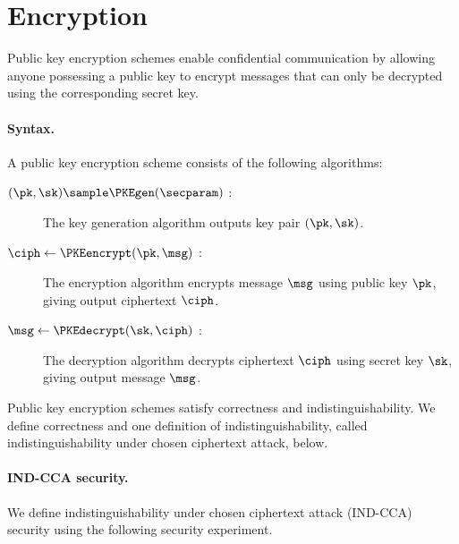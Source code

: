 \section{Encryption}\label{sec:prelims-encryption}

Public key encryption schemes enable confidential communication by allowing
anyone possessing a public key to encrypt messages that can only be decrypted
using the corresponding secret key.

\paragraph{Syntax.} A public key encryption scheme consists of the following
algorithms:

\begin{description}

  \item[$(\pk, \sk) \sample \PKEgen(\secparam)$ : ] The key generation
    algorithm outputs key pair $(\pk, \sk)$.

  \item[$\ciph \leftarrow \PKEencrypt(\pk, \msg)$ : ] The encryption algorithm
    encrypts message $\msg$ using public key $\pk$, giving output ciphertext
    $\ciph$.

  \item[$\msg \leftarrow \PKEdecrypt(\sk, \ciph)$ : ] The decryption algorithm
    decrypts ciphertext $\ciph$ using secret key $\sk$, giving output message
    $\msg$.

\end{description}

Public key encryption schemes satisfy correctness and indistinguishability. We
define correctness and one definition of indistinguishability, called
indistinguishability under chosen ciphertext attack, below.

\paragraph{IND-CCA security.} We define indistinguishability under chosen
ciphertext attack (IND-CCA) security using the following security experiment.

